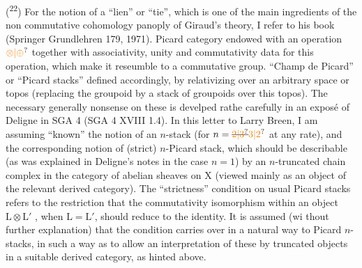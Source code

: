 
(\textsuperscript{22}) For the notion of a ``lien'' or ``tie'', which is one of the main ingredients of the non commutative cohomology panoply of Giraud's theory, I refer to his book (Springer Grundlehren 179, 1971).  Picard category  endowed with an operation $\unsure{\otimes|\oplus}$  together with associativity, unity and commutativity data for this operation, which make it reseumble to a commutative group.  ``Champ de Picard'' or ``Picard stacks''  defined accordingly, by relativizing over an arbitrary space or topos (replacing the groupoid by a stack of groupoids over this topos). The necessary generally nonsense on these is develped rathe carefully in an exposé of Deligne in SGA 4 (SGA 4 XVIII 1.4). In this letter to Larry Breen, I am assuming ``known'' the notion of an $n$-stack (for $n=\deleted{\unsure{2|3}}\unsure{3|2}$ at any rate), and the corresponding notion of (strict) $n$-Picard stack, which should be describable (as was explained in Deligne's notes in the case $n=1$) by an $n$-truncated chain complex in the category of abelian sheaves on $\mathrm{X}$ (viewed mainly as an object of the relevant derived category). The ``strictness'' condition on usual Picard stacks refers to the restriction that the commutativity isomorphism within an object $\mathrm{L}\otimes\mathrm{L}'$ ,  when $\mathrm{L}=\mathrm{L}'$, should reduce to the identity. It is assumed (wi thout further explanation) that the condition carries over in a natural way to Picard $n$-stacks, in such a way as to allow an interpretation of these by truncated objects in a suitable derived category, as hinted above.

